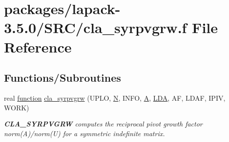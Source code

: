 \hypertarget{cla__syrpvgrw_8f}{}\section{packages/lapack-\/3.5.0/\+S\+R\+C/cla\+\_\+syrpvgrw.f File Reference}
\label{cla__syrpvgrw_8f}
\subsection*{Functions/\+Subroutines}
\begin{DoxyCompactItemize}
\item 
real \hyperlink{afunc_8m_a7b5e596df91eadea6c537c0825e894a7}{function} \hyperlink{group__complexSYcomputational_ga92d8371d36124d4439f63473ee47854b}{cla\+\_\+syrpvgrw} (U\+P\+L\+O, \hyperlink{polmisc_8c_a0240ac851181b84ac374872dc5434ee4}{N}, I\+N\+F\+O, \hyperlink{classA}{A}, \hyperlink{example__user_8c_ae946da542ce0db94dced19b2ecefd1aa}{L\+D\+A}, A\+F, L\+D\+A\+F, I\+P\+I\+V, W\+O\+R\+K)
\begin{DoxyCompactList}\small\item\em {\bfseries C\+L\+A\+\_\+\+S\+Y\+R\+P\+V\+G\+R\+W} computes the reciprocal pivot growth factor norm(\+A)/norm(U) for a symmetric indefinite matrix. \end{DoxyCompactList}\end{DoxyCompactItemize}
